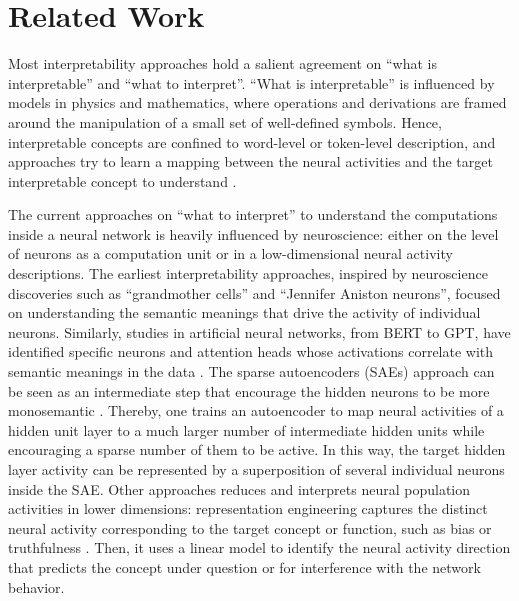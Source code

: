 \section{Related Work}
Most interpretability approaches hold a salient agreement on ``what is interpretable'' and ``what to interpret''. ``What is interpretable'' is influenced by models in physics and mathematics, where operations and derivations are framed around the manipulation of a small set of well-defined symbols. Hence, interpretable concepts are confined to word-level or token-level description, and approaches try to learn a mapping between the neural activities and the target interpretable concept to understand \cite{geva_transformer_2022, zou_representation_2023, belinkov-2022-probing,belrose2023tunedlens,pal2023futurelens,yomdin2023jump}. %

The current approaches on ``what to interpret'' to understand the computations inside a neural network is heavily influenced by neuroscience: either on the level of neurons as a computation unit or in a low-dimensional neural activity descriptions. The earliest interpretability approaches, inspired by neuroscience discoveries such as ``grandmother cells'' and ``Jennifer Aniston neurons'', focused on understanding the semantic meanings that drive the activity of individual neurons. Similarly, studies in artificial neural networks, from BERT to GPT, have identified specific neurons and attention heads whose activations correlate with semantic meanings in the data \cite{olah2020neuron, elhage2022toy, wang2022interpretabilitywildcircuitindirect, marks2024sparsefeaturecircuitsdiscovering, bau2020concept, goh2021multimodal, nguyen2016synthesizing, mu2021compositionalexplanationsneurons, radford2017learninggeneratereviewsdiscovering}. The sparse autoencoders (SAEs) approach can be seen as an intermediate step that encourage the hidden neurons to be more monosemantic \cite{bricken2023interpretable,braun2024identifyingfunctionallyimportantfeatures, cunningham2023sparseautoencodershighlyinterpretable,chaudhary2024evaluatingopensourcesparseautoencoders,karvonen2024evaluatingsparseautoencoderstargeted}. Thereby, one trains an autoencoder to map neural activities of a hidden unit layer to a much larger number of intermediate hidden units while encouraging a sparse number of them to be active. In this way, the target hidden layer activity can be represented by a superposition of several individual neurons inside the SAE. 
Other approaches reduces and interprets neural population activities in lower dimensions: representation engineering  captures the distinct neural activity corresponding to the target concept or function, such as bias or truthfulness \cite{zou_representation_2023}. Then, it uses a linear model to identify the neural activity direction that predicts the concept under question or for interference with the network behavior. 

